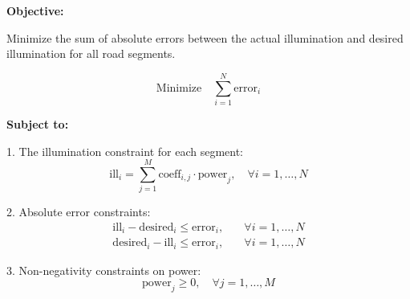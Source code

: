 \documentclass{article}
\begin{document}
\textbf{Objective:}

Minimize the sum of absolute errors between the actual illumination and desired illumination for all road segments.

\[
\text{Minimize} \quad \sum_{i=1}^{N} \text{error}_i 
\]

\textbf{Subject to:}

1. The illumination constraint for each segment:
\[
\text{ill}_i = \sum_{j=1}^{M} \text{coeff}_{i,j} \cdot \text{power}_j, \quad \forall i = 1, \ldots, N
\]

2. Absolute error constraints:
\[
\begin{align*}
\text{ill}_i - \text{desired}_i \leq \text{error}_i, \quad & \forall i = 1, \ldots, N \\
\text{desired}_i - \text{ill}_i \leq \text{error}_i, \quad & \forall i = 1, \ldots, N 
\end{align*}
\]

3. Non-negativity constraints on power:
\[
\text{power}_j \geq 0, \quad \forall j = 1, \ldots, M
\]
\end{document}
